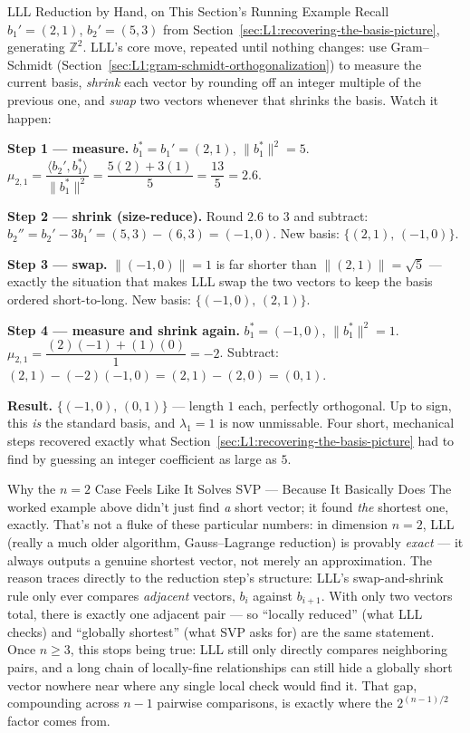\begin{exbox}{LLL Reduction by Hand, on This Section's Running Example}
Recall $b_1'=(2,1)$, $b_2'=(5,3)$ from Section~\ref{sec:L1:recovering-the-basis-picture}, generating $\mathbb{Z}^2$. LLL's core move, repeated until nothing changes: use Gram--Schmidt (Section~\ref{sec:L1:gram-schmidt-orthogonalization}) to measure the current basis, \emph{shrink} each vector by rounding off an integer multiple of the previous one, and \emph{swap} two vectors whenever that shrinks the basis. Watch it happen:

\textbf{Step 1 --- measure.} $b_1^*=b_1'=(2,1)$, $\|b_1^*\|^2=5$. $\mu_{2,1}=\dfrac{\langle b_2',b_1^*\rangle}{\|b_1^*\|^2}=\dfrac{5(2)+3(1)}{5}=\dfrac{13}{5}=2.6$.

\textbf{Step 2 --- shrink (size-reduce).} Round $2.6$ to $3$ and subtract: $b_2'' = b_2' - 3b_1' = (5,3)-(6,3) = (-1,0)$. New basis: $\{(2,1),\,(-1,0)\}$.

\textbf{Step 3 --- swap.} $\|(-1,0)\|=1$ is far shorter than $\|(2,1)\|=\sqrt5$ --- exactly the situation that makes LLL swap the two vectors to keep the basis ordered short-to-long. New basis: $\{(-1,0),\,(2,1)\}$.

\textbf{Step 4 --- measure and shrink again.} $b_1^*=(-1,0)$, $\|b_1^*\|^2=1$. $\mu_{2,1}=\dfrac{(2)(-1)+(1)(0)}{1}=-2$. Subtract: $(2,1)-(-2)(-1,0) = (2,1)-(2,0)=(0,1)$.

\textbf{Result.} $\{(-1,0),\,(0,1)\}$ --- length $1$ each, perfectly orthogonal. Up to sign, this \emph{is} the standard basis, and $\lambda_1=1$ is now unmissable. Four short, mechanical steps recovered exactly what Section~\ref{sec:L1:recovering-the-basis-picture} had to find by guessing an integer coefficient as large as $5$.
\end{exbox}

\begin{rmkbox}{Why the $n=2$ Case Feels Like It Solves SVP --- Because It Basically Does}
The worked example above didn't just find \emph{a} short vector; it found \emph{the} shortest one, exactly. That's not a fluke of these particular numbers: in dimension $n=2$, LLL (really a much older algorithm, Gauss--Lagrange reduction) is provably \emph{exact} --- it always outputs a genuine shortest vector, not merely an approximation. The reason traces directly to the reduction step's structure: LLL's swap-and-shrink rule only ever compares \emph{adjacent} vectors, $b_i$ against $b_{i+1}$. With only two vectors total, there is exactly one adjacent pair --- so ``locally reduced'' (what LLL checks) and ``globally shortest'' (what SVP asks for) are the same statement. Once $n\ge3$, this stops being true: LLL still only directly compares neighboring pairs, and a long chain of locally-fine relationships can still hide a globally short vector nowhere near where any single local check would find it. That gap, compounding across $n-1$ pairwise comparisons, is exactly where the $2^{(n-1)/2}$ factor comes from.
\end{rmkbox}


